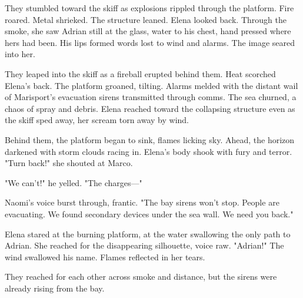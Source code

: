 They stumbled toward the skiff as explosions rippled through the platform. Fire roared. Metal shrieked. The structure leaned. Elena looked back. Through the smoke, she saw Adrian still at the glass, water to his chest, hand pressed where hers had been. His lips formed words lost to wind and alarms. The image seared into her.

They leaped into the skiff as a fireball erupted behind them. Heat scorched Elena's back. The platform groaned, tilting. Alarms melded with the distant wail of Marisport's evacuation sirens transmitted through comms. The sea churned, a chaos of spray and debris. Elena reached toward the collapsing structure even as the skiff sped away, her scream torn away by wind.

Behind them, the platform began to sink, flames licking sky. Ahead, the horizon darkened with storm clouds racing in. Elena's body shook with fury and terror. "Turn back!" she shouted at Marco.

"We can't!" he yelled. "The charges—"

Naomi's voice burst through, frantic. "The bay sirens won't stop. People are evacuating. We found secondary devices under the sea wall. We need you back."

Elena stared at the burning platform, at the water swallowing the only path to Adrian. She reached for the disappearing silhouette, voice raw. "Adrian!" The wind swallowed his name. Flames reflected in her tears.

They reached for each other across smoke and distance, but the sirens were already rising from the bay.

